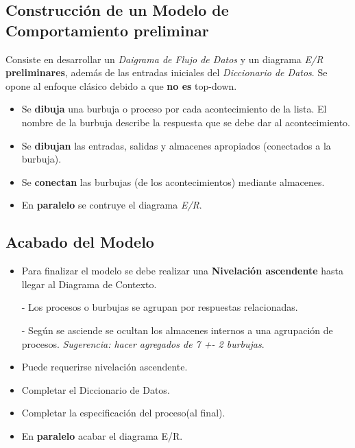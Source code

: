\subsection{Construcción de un Modelo de Comportamiento preliminar} %

Consiste en desarrollar un \textit{Daigrama de Flujo de Datos} y un diagrama \textit{E/R} \textbf{preliminares}, además de las entradas iniciales del \textit{Diccionario de Datos}. Se opone al enfoque clásico debido a que \textbf{no es} top-down.

\begin{itemize}[noitemsep]
\item Se \textbf{dibuja} una burbuja o proceso por cada acontecimiento de la lista. El nombre de la burbuja describe la respuesta que se debe dar al acontecimiento.
\item Se \textbf{dibujan} las entradas, salidas y almacenes apropiados (conectados a la burbuja).
\item Se \textbf{conectan} las burbujas (de los acontecimientos) mediante almacenes.
\item En \textbf{paralelo} se contruye el diagrama \textit{E/R}.
\end{itemize}


\subsection{Acabado del Modelo}

\begin{itemize}[noitemsep]
\item Para finalizar el modelo se debe realizar una \textbf{Nivelación ascendente} hasta llegar al Diagrama de Contexto.

  - Los procesos o burbujas se agrupan por respuestas relacionadas.

  - Según se asciende se ocultan los almacenes internos a una agrupación de procesos. \textit{Sugerencia: hacer agregados de 7 +- 2 burbujas}.

\item Puede requerirse nivelación ascendente.
\item Completar el Diccionario de Datos.
\item Completar la especificación del proceso(al final).
\item En \textbf{paralelo} acabar el diagrama E/R.
\end{itemize}

